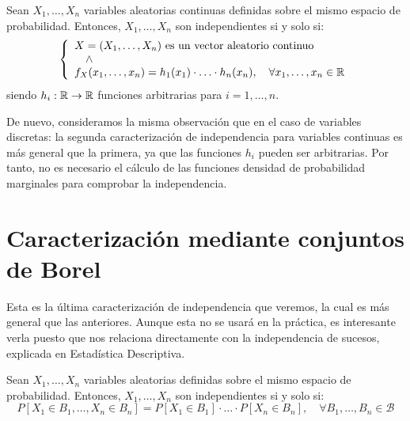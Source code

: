 \begin{prop}
    Sean $X_1, \ldots, X_n$ variables aleatorias continuas definidas sobre el mismo espacio de probabilidad. Entonces, $X_1, \ldots, X_n$ son independientes si y solo si:
    \[
        \left\{
            \begin{array}{l}
                X=(X_1, \ldots, X_n) \text{ es un vector aleatorio continuo} \\
                \quad \land \\
                f_X(x_1, \ldots, x_n) = h_1(x_1) \cdot \ldots \cdot h_n(x_n), \quad \forall x_1, \ldots, x_n \in \mathbb{R}
            \end{array}
        \right.
    \]
    siendo $h_i: \mathbb{R} \to \mathbb{R}$ funciones arbitrarias para $i = 1, \ldots, n$.
\end{prop}

\begin{observacion}
    De nuevo, consideramos la misma observación que en el caso de variables discretas: la segunda caracterización de independencia para variables continuas es más general que la primera, ya que las funciones $h_i$ pueden ser arbitrarias. Por tanto, no es necesario el cálculo de las funciones densidad de probabilidad marginales para comprobar la independencia.
\end{observacion}


\section{Caracterización mediante conjuntos de Borel}

Esta es la última caracterización de independencia que veremos, la cual es más general que las anteriores. Aunque esta no se usará en la práctica, es interesante verla puesto que nos relaciona directamente con la independencia de sucesos, explicada en Estadística Descriptiva.
\begin{prop}
    Sean $X_1, \ldots, X_n$ variables aleatorias definidas sobre el mismo espacio de probabilidad. Entonces, $X_1, \ldots, X_n$ son independientes si y solo si:
    \[
        P[X_1 \in B_1, \ldots, X_n \in B_n] = P[X_1 \in B_1] \cdot \ldots \cdot P[X_n \in B_n], \quad \forall B_1, \ldots, B_n \in \mathcal{B}
    \]
\end{prop}


